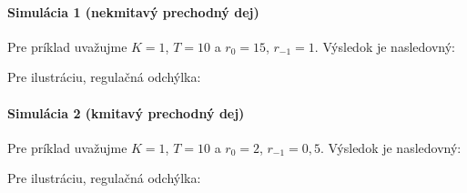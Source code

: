\documentclass[a4paper, 10pt, ]{article}
\begin{document}
\paragraph{Simulácia 1 (nekmitavý prechodný dej)}

Pre príklad uvažujme $K = 1$, $T = 10$ a $r_0 = 15$, $r_{-1} = 1$. Výsledok je nasledovný:

\begin{center}



    \figcaption{}

\end{center}

\noindent
Pre ilustráciu, regulačná odchýlka:


\begin{center}



    \figcaption{}

\end{center}






\paragraph{Simulácia 2 (kmitavý prechodný dej)}

Pre príklad uvažujme $K = 1$, $T = 10$ a $r_0 = 2$, $r_{-1} = 0,5$. Výsledok je nasledovný:

\begin{center}



    \figcaption{}

\end{center}

\noindent
Pre ilustráciu, regulačná odchýlka:
\end{document}
